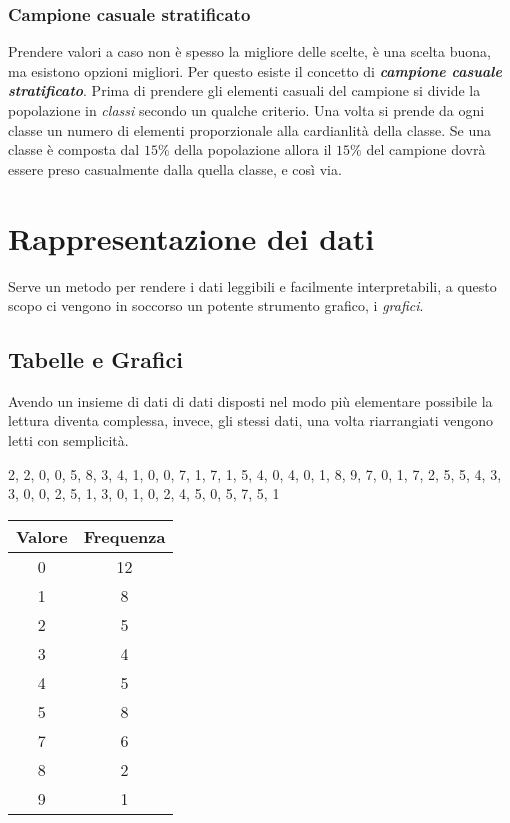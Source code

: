\documentclass{article}
\begin{document}
    \subsubsection*{Campione casuale stratificato}
      Prendere valori a caso non è spesso la migliore delle scelte, è una scelta buona, ma esistono opzioni migliori. Per questo esiste il concetto di \textbf{\textit{campione casuale stratificato}}. Prima di prendere gli elementi casuali del campione si divide la popolazione in \textit{classi} secondo un qualche criterio. Una volta si prende da ogni classe un numero di elementi proporzionale alla cardianlità della classe. Se una classe è composta dal $15\%$ della popolazione allora il $15\%$ del campione dovrà essere preso casualmente dalla quella classe, e così via. 

\section{Rappresentazione dei dati}
  Serve un metodo per rendere i dati leggibili e facilmente interpretabili, a questo scopo ci vengono in soccorso un potente strumento grafico, i \textit{grafici}.

  \subsection{Tabelle e Grafici}
    Avendo un insieme di dati di dati disposti nel modo più elementare possibile la lettura diventa complessa, invece, gli stessi dati, una volta riarrangiati vengono letti con semplicità.
  
    \begin{minipage}[t]{0.45\textwidth}
    \begin{flushleft}
      2, 2, 0, 0, 5, 8, 3, 4, 1, 0, 0, 7, 1, 7, 1, 5, 4, 0, 4, 0, 1, 8, 9, 7, 0, 1, 7, 2, 5, 5, 4, 3, 3, 0, 0, 2, 5, 1, 3, 0, 1, 0, 2, 4, 5, 0, 5, 7, 5, 1
    \end{flushleft}
    \end{minipage}%
    \hfill
    \begin{minipage}[t]{0.45\textwidth}
    \begin{tabular}{|c|c|}
      \hline
      \textbf{Valore} & \textbf{Frequenza} \\
      \hline
      0 & 12 \\
      \hline
      1 & 8 \\
      \hline
      2 & 5 \\
      \hline
      3 & 4 \\
      \hline
      4 & 5 \\
      \hline
      5 & 8 \\
      \hline
      7 & 6 \\
      \hline
      8 & 2 \\
      \hline
      9 & 1 \\
      \hline
    \end{tabular}
    \end{minipage}
\end{document}
